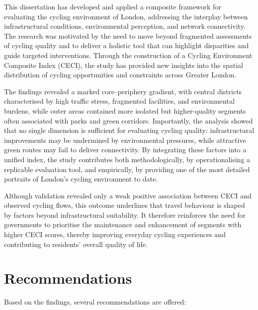 \documentclass[
  12pt,
  oneside]{book}
\begin{document}
This dissertation has developed and applied a composite framework for evaluating the cycling environment of London, addressing the interplay between infrastructural conditions, environmental perception, and network connectivity. The research was motivated by the need to move beyond fragmented assessments of cycling quality and to deliver a holistic tool that can highlight disparities and guide targeted interventions. Through the construction of a Cycling Environment Composite Index (CECI), the study has provided new insights into the spatial distribution of cycling opportunities and constraints across Greater London.

The findings revealed a marked core--periphery gradient, with central districts characterised by high traffic stress, fragmented facilities, and environmental burdens, while outer areas contained more isolated but higher-quality segments often associated with parks and green corridors. Importantly, the analysis showed that no single dimension is sufficient for evaluating cycling quality: infrastructural improvements may be undermined by environmental pressures, while attractive green routes may fail to deliver connectivity. By integrating these factors into a unified index, the study contributes both methodologically, by operationalising a replicable evaluation tool, and empirically, by providing one of the most detailed portraits of London's cycling environment to date.

Although validation revealed only a weak positive association between CECI and observed cycling flows, this outcome underlines that travel behaviour is shaped by factors beyond infrastructural suitability. It therefore reinforces the need for governments to prioritise the maintenance and enhancement of segments with higher CECI scores, thereby improving everyday cycling experiences and contributing to residents' overall quality of life.

\section{Recommendations}\label{recommendations}

Based on the findings, several recommendations are offered:
\end{document}

